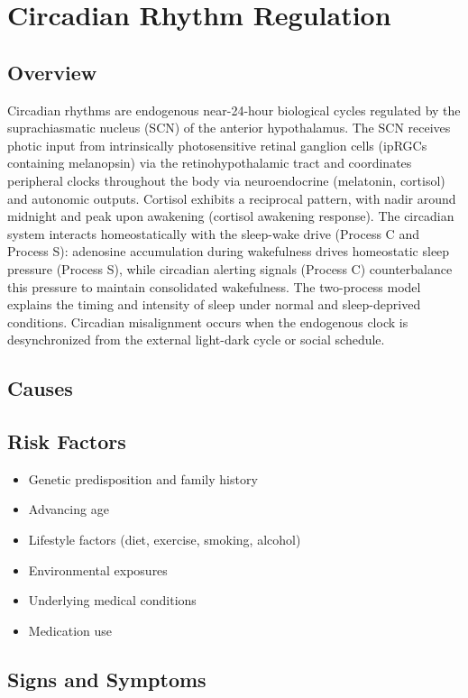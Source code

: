 \chapter{Circadian Rhythm Regulation}
\label{sec:Circadian Rhythm Regulation}

\section{Overview}
Circadian rhythms are endogenous near-24-hour biological cycles regulated by the suprachiasmatic nucleus (SCN) of the anterior hypothalamus. The SCN receives photic input from intrinsically photosensitive retinal ganglion cells (ipRGCs containing melanopsin) via the retinohypothalamic tract and coordinates peripheral clocks throughout the body via neuroendocrine (melatonin, cortisol) and autonomic outputs. Cortisol exhibits a reciprocal pattern, with nadir around midnight and peak upon awakening (cortisol awakening response). The circadian system interacts homeostatically with the sleep-wake drive (Process C and Process S): adenosine accumulation during wakefulness drives homeostatic sleep pressure (Process S), while circadian alerting signals (Process C) counterbalance this pressure to maintain consolidated wakefulness. The two-process model explains the timing and intensity of sleep under normal and sleep-deprived conditions. Circadian misalignment occurs when the endogenous clock is desynchronized from the external light-dark cycle or social schedule.
\section{Causes}
\section{Risk Factors}

\begin{itemize}[noitemsep]
  \item Genetic predisposition and family history
  \item Advancing age
  \item Lifestyle factors (diet, exercise, smoking, alcohol)
  \item Environmental exposures
  \item Underlying medical conditions
  \item Medication use
\end{itemize}
\section{Signs and Symptoms}

